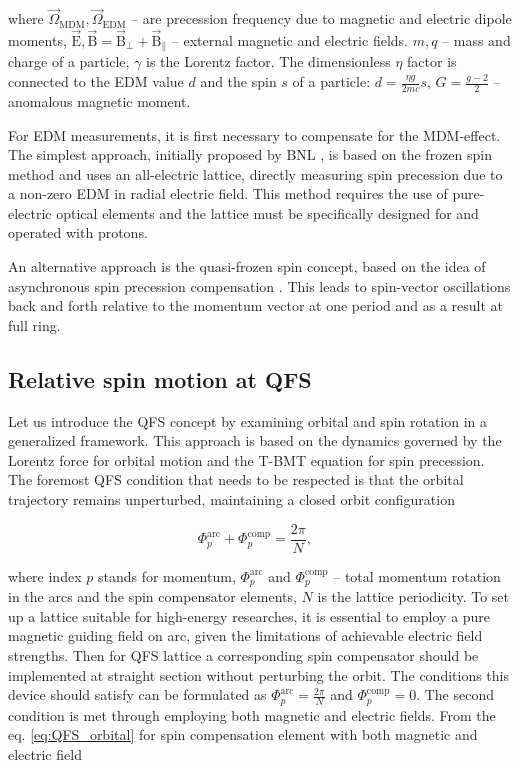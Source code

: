 \documentclass[submitting]{nst}
\begin{document}
\noindent where $\vec{\Omega}_{\text{MDM}}, \vec{\Omega}_{\text{EDM}}$ -- are precession frequency due to magnetic and electric dipole moments, $\vec{\mathrm{E}}, \vec{\mathrm{B}} = \vec{\mathrm{B}}_{\perp} + \vec{\mathrm{B}}_{\|}$ -- external magnetic and electric fields. $m, q$ -- mass and charge of a particle, $\gamma$ is the Lorentz factor. The dimensionless $\eta$ factor is connected to the EDM value $d$ and the spin $s$ of a particle: $d = \frac{\eta g}{2mc}s$, $G=\frac{g-2}{2}$ -- 
anomalous magnetic moment. 

\par For EDM measurements, it is first necessary to compensate for the MDM-effect. The simplest approach, initially proposed by BNL \cite{BNL}, is based on the frozen spin method and uses an all-electric lattice, directly measuring spin precession due to a non-zero EDM in radial electric field. This method requires the use of pure-electric optical elements and the lattice must be specifically designed for and operated with protons.
\par An alternative approach is the quasi-frozen spin concept, based on the idea of asynchronous spin precession compensation \cite{QFS}. This leads to spin-vector oscillations back and forth relative to the momentum vector at one period and as a result at full ring.

\subsection{Relative spin motion at QFS}    

\par Let us introduce the QFS concept by examining orbital and spin rotation in a generalized framework. This approach is based on the dynamics governed by the Lorentz force for orbital motion and the T-BMT equation for spin precession. The foremost QFS condition that needs to be respected is that the orbital trajectory remains unperturbed, maintaining a closed orbit configuration

\begin{equation}
	\Phi_p^{\textrm{arc}}+\Phi_{p}^{\textrm{comp}}=\frac{2\pi}{N},\ \ \
	\label{eq:QFS_orbital}
\end{equation}

\noindent where index $p$ stands for momentum, $\Phi_p^{\textrm{arc}}$ and $\Phi_{p}^{\textrm{comp}}$ -- total momentum rotation in the arcs and the spin compensator elements, $N$ is the lattice periodicity. To set up a lattice suitable for high-energy researches, it is essential to employ a pure magnetic guiding field on arc, given the limitations of achievable electric field strengths. Then for QFS lattice a corresponding spin compensator should be implemented at straight section without perturbing the orbit. The conditions this device should satisfy can be formulated as $\Phi_p^{\textrm{arc}} = \frac{2\pi}{N}$ and $\Phi_{p}^{\textrm{comp}} = 0$. The second condition is met through employing both magnetic and electric fields. From the eq. \ref{eq:QFS_orbital} for spin compensation element with both magnetic and electric field
\end{document}
